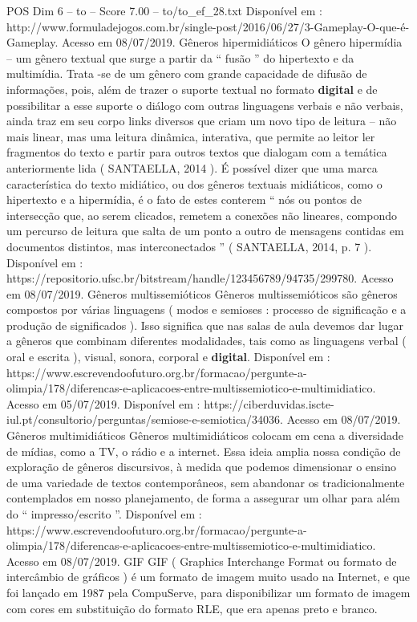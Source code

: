 \begin{textsample}{POS Dim 6 – to – Score 7.00 – to/to\_ef\_28.txt}
Disponível em : http://www.formuladejogos.com.br/single-post/2016/06/27/3-Gameplay-O-que-é-Gameplay.
Acesso em 08/07/2019.
Gêneros hipermidiáticos O gênero hipermídia – um gênero textual que surge a partir da “ fusão ” do hipertexto e da multimídia.
Trata -se de um gênero com grande capacidade de difusão de informações, pois, além de trazer o suporte textual no formato \textbf{digital} e de possibilitar a esse suporte o diálogo com outras linguagens verbais e não verbais, ainda traz em seu corpo links diversos que criam um novo tipo de leitura – não mais linear, mas uma leitura dinâmica, interativa, que permite ao leitor ler fragmentos do texto e partir para outros textos que dialogam com a temática anteriormente lida ( SANTAELLA, 2014 ).
É possível dizer que uma marca característica do texto midiático, ou dos gêneros textuais midiáticos, como o hipertexto e a hipermídia, é o fato de estes conterem “ nós ou pontos de intersecção que, ao serem clicados, remetem a conexões não lineares, compondo um percurso de leitura que salta de um ponto a outro de mensagens contidas em documentos distintos, mas interconectados ” ( SANTAELLA, 2014, p. 7 ).
Disponível em : https://repositorio.ufsc.br/bitstream/handle/123456789/94735/299780.
Acesso em 08/07/2019.
Gêneros multissemióticos Gêneros multissemióticos são gêneros compostos por várias linguagens ( modos e semioses : processo de significação e a produção de significados ).
Isso significa que nas salas de aula devemos dar lugar a gêneros que combinam diferentes modalidades, tais como as linguagens verbal ( oral e escrita ), visual, sonora, corporal e \textbf{digital}.
Disponível em : https://www.escrevendoofuturo.org.br/formacao/pergunte-a-olimpia/178/diferencas-e-aplicacoes-entre-multissemiotico-e-multimidiatico.
Acesso em 05/07/2019.
Disponível em : https://ciberduvidas.iscte-iul.pt/consultorio/perguntas/semiose-e-semiotica/34036.
Acesso em 08/07/2019.
Gêneros multimidiáticos Gêneros multimidiáticos colocam em cena a diversidade de mídias, como a TV, o rádio e a internet.
Essa ideia amplia nossa condição de exploração de gêneros discursivos, à medida que podemos dimensionar o ensino de uma variedade de textos contemporâneos, sem abandonar os tradicionalmente contemplados em nosso planejamento, de forma a assegurar um olhar para além do “ impresso/escrito ”.
Disponível em : https://www.escrevendoofuturo.org.br/formacao/pergunte-a-olimpia/178/diferencas-e-aplicacoes-entre-multissemiotico-e-multimidiatico.
Acesso em 08/07/2019.
GIF GIF ( Graphics Interchange Format ou formato de intercâmbio de gráficos ) é um formato de imagem muito usado na Internet, e que foi lançado em 1987 pela CompuServe, para disponibilizar um formato de imagem com cores em substituição do formato RLE, que era apenas preto e branco.

\end{textsample}
